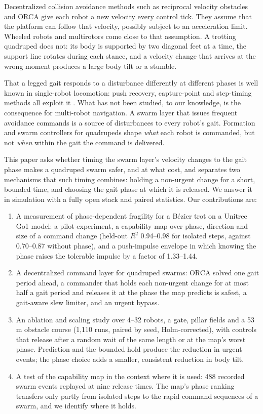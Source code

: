 \documentclass[pdflatex,sn-mathphys-num]{sn-jnl}
\begin{document}
Decentralized collision avoidance methods such as reciprocal velocity obstacles and ORCA
\cite{vandenberg2008rvo,vandenberg2011orca} give each robot a new velocity every control tick. They assume
that the platform can follow that velocity, possibly subject to an acceleration limit. Wheeled robots and
multirotors come close to that assumption. A trotting quadruped does not: its body is supported by two
diagonal feet at a time, the support line rotates during each stance, and a velocity change that arrives
at the wrong moment produces a large body tilt or a stumble.

That a legged gait responds to a disturbance differently at different phases is well known in
single-robot locomotion: push recovery, capture-point and step-timing methods all exploit it
\cite{pratt2006capture,khadiv2016step,chen2022capturability,hobbelen2007gsn}. What has not been studied,
to our knowledge, is the consequence for multi-robot navigation. A swarm layer that issues frequent
avoidance commands is a source of disturbances to every robot's gait. Formation and swarm controllers for
quadrupeds \cite{zhan2025safe,noren2026role} shape \emph{what} each robot is commanded, but not \emph{when}
within the gait the command is delivered.

This paper asks whether timing the swarm layer's velocity changes to the gait phase makes a quadruped
swarm safer, and at what cost, and separates two mechanisms that such timing combines: holding a
non-urgent change for a short, bounded time, and choosing the gait phase at which it is released. We
answer it in simulation with a fully open stack and paired statistics. Our contributions are:
\begin{enumerate}
  \item A measurement of phase-dependent fragility for a B\'ezier trot on a Unitree Go1 model: a pilot
    experiment, a capability map over phase, direction and size of a command change (held-out
    $R^2$ 0.94--0.98 for isolated steps, against 0.70--0.87 without phase), and a push-impulse envelope in
    which knowing the phase raises the tolerable impulse by a factor of 1.33--1.44.
  \item A decentralized command layer for quadruped swarms: ORCA solved one gait period ahead, a
    commander that holds each non-urgent change for at most half a gait period and releases it at the
    phase the map predicts is safest, a gait-aware slew limiter, and an urgent bypass.
  \item An ablation and scaling study over 4--32 robots, a gate, pillar fields and a 53\,m obstacle course
    (1{,}110 runs, paired by seed, Holm-corrected), with controls that release after a random wait of the
    same length or at the map's worst phase. Prediction and the bounded hold produce the reduction in
    urgent events; the phase choice adds a smaller, consistent reduction in body tilt.
  \item A test of the capability map in the context where it is used: 488 recorded swarm events replayed at
    nine release times. The map's phase ranking transfers only partly from isolated steps to the rapid
    command sequences of a swarm, and we identify where it holds.
\end{enumerate}
\end{document}
